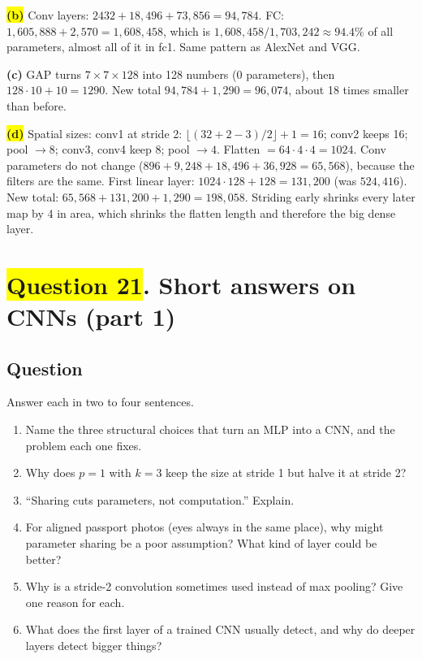 \documentclass[12pt,a4paper]{article}
\newcommand{\hlq}[1]{{\setlength{\fboxsep}{1.5pt}\colorbox{yellow}{#1}}}
\begin{document}
\hlq{\textbf{(b)}} Conv layers: $2432+18{,}496+73{,}856=94{,}784$. FC: $1{,}605{,}888+2{,}570=1{,}608{,}458$, which is $1{,}608{,}458/1{,}703{,}242\approx94.4\%$ of all parameters, almost all of it in fc1. Same pattern as AlexNet and VGG.

\textbf{(c)} GAP turns $7\times7\times128$ into 128 numbers (0 parameters), then $128\cdot10+10=1290$. New total $94{,}784+1{,}290=96{,}074$, about 18 times smaller than before.

\hlq{\textbf{(d)}} Spatial sizes: conv1 at stride 2: $\lfloor(32+2-3)/2\rfloor+1=16$; conv2 keeps 16; pool $\to8$; conv3, conv4 keep 8; pool $\to4$. Flatten $=64\cdot4\cdot4=1024$. Conv parameters do not change ($896+9{,}248+18{,}496+36{,}928=65{,}568$), because the filters are the same. First linear layer: $1024\cdot128+128=131{,}200$ (was $524{,}416$). New total: $65{,}568+131{,}200+1{,}290=198{,}058$. Striding early shrinks every later map by 4 in area, which shrinks the flatten length and therefore the big dense layer.

\section[Question 21. Short answers on CNNs (part 1)]{\hlq{Question 21}. Short answers on CNNs (part 1)}
\subsection*{Question}
Answer each in two to four sentences.
\begin{enumerate}[label=(\alph*)]
\item[\hlq{(a)}] Name the three structural choices that turn an MLP into a CNN, and the problem each one fixes.
\item[\hlq{(b)}] Why does $p=1$ with $k=3$ keep the size at stride 1 but halve it at stride 2?
\item[(c)] ``Sharing cuts parameters, not computation.'' Explain.
\item[\hlq{(d)}] For aligned passport photos (eyes always in the same place), why might parameter sharing be a poor assumption? What kind of layer could be better?
\item[(e)] Why is a stride-2 convolution sometimes used instead of max pooling? Give one reason for each.
\item[(f)] What does the first layer of a trained CNN usually detect, and why do deeper layers detect bigger things?
\end{enumerate}
\end{document}
